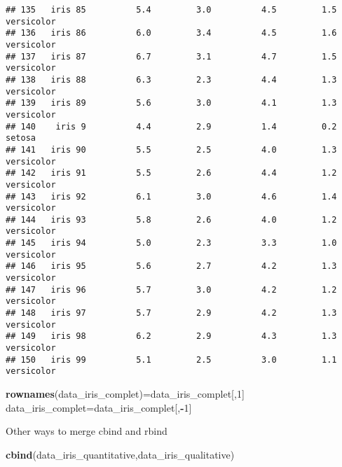 \documentclass[
]{article}
\newenvironment{Shaded}{\begin{snugshade}}{\end{snugshade}}
\newcommand{\DecValTok}[1]{\textcolor[rgb]{0.00,0.00,0.81}{#1}}
\newcommand{\FunctionTok}[1]{\textcolor[rgb]{0.13,0.29,0.53}{\textbf{#1}}}
\newcommand{\NormalTok}[1]{#1}
\newcommand{\OtherTok}[1]{\textcolor[rgb]{0.56,0.35,0.01}{#1}}
\newcommand{\SpecialCharTok}[1]{\textcolor[rgb]{0.81,0.36,0.00}{\textbf{#1}}}
\begin{document}
\begin{verbatim}
## 135   iris 85          5.4         3.0          4.5         1.5 versicolor
## 136   iris 86          6.0         3.4          4.5         1.6 versicolor
## 137   iris 87          6.7         3.1          4.7         1.5 versicolor
## 138   iris 88          6.3         2.3          4.4         1.3 versicolor
## 139   iris 89          5.6         3.0          4.1         1.3 versicolor
## 140    iris 9          4.4         2.9          1.4         0.2     setosa
## 141   iris 90          5.5         2.5          4.0         1.3 versicolor
## 142   iris 91          5.5         2.6          4.4         1.2 versicolor
## 143   iris 92          6.1         3.0          4.6         1.4 versicolor
## 144   iris 93          5.8         2.6          4.0         1.2 versicolor
## 145   iris 94          5.0         2.3          3.3         1.0 versicolor
## 146   iris 95          5.6         2.7          4.2         1.3 versicolor
## 147   iris 96          5.7         3.0          4.2         1.2 versicolor
## 148   iris 97          5.7         2.9          4.2         1.3 versicolor
## 149   iris 98          6.2         2.9          4.3         1.3 versicolor
## 150   iris 99          5.1         2.5          3.0         1.1 versicolor
\end{verbatim}

\begin{Shaded}
\begin{Highlighting}[]
\FunctionTok{rownames}\NormalTok{(data\_iris\_complet)}\OtherTok{=}\NormalTok{data\_iris\_complet[,}\DecValTok{1}\NormalTok{]}
\NormalTok{data\_iris\_complet}\OtherTok{=}\NormalTok{data\_iris\_complet[,}\SpecialCharTok{{-}}\DecValTok{1}\NormalTok{]}
\end{Highlighting}
\end{Shaded}

Other ways to merge cbind and rbind

\begin{Shaded}
\begin{Highlighting}[]
\FunctionTok{cbind}\NormalTok{(data\_iris\_quantitative,data\_iris\_qualitative)}
\end{Highlighting}
\end{Shaded}
\end{document}
